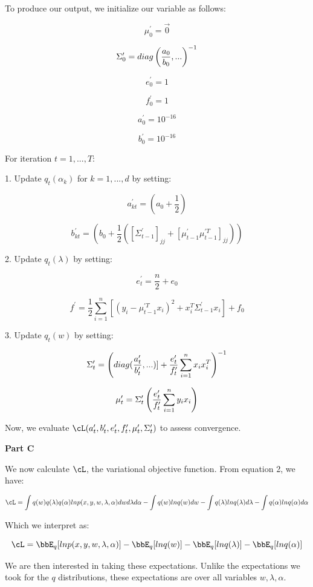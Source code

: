 \documentclass[twoside,11pt]{homework}
\begin{document}
To produce our output, we initialize our variable as follows:

\[
\mu^\prime_0 = \vec{0}
\]

\[
\Sigma^\prime_0 = diag\left(\frac{a_0}{b_0},...\right)^{-1}
\]

\[
e^\prime_0 = 1
\]

\[
f^\prime_0 = 1
\]

\[
a^\prime_0 = 10^{-16}
\]

\[
b^\prime_0 = 10^{-16}
\]

For iteration $t = 1, ..., T$:

1. Update $q_t(\alpha_k)$ for $k = 1, ..., d$ by setting:
	
\[
a^\prime_{kt} = (a_0 + \frac{1}{2})
\]

\[
b^\prime_{kt} = (b_0 + \frac{1}{2}([\Sigma^\prime_{t-1}]_{jj} + [\mu^\prime_{t-1} \mu^{\prime T}_{t-1}]_{jj}))
\]

2. Update $q_t(\lambda)$ by setting:

\[
e^\prime_t = \frac{n}{2} + e_0
\]

\[
f^\prime = \frac{1}{2} \sum_{i=1}^n [(y_i - \mu^{\prime T}_{t-1}x_i)^2 + x_i^T\Sigma^\prime_{t-1} x_i] + f_0
\]

3. Update $q_t(w)$ by setting:

\[
\Sigma^\prime_t = \left(diag(\frac{a^\prime_t}{b^\prime_t},...)] + \frac{e^\prime_t}{f^\prime_t} \sum_{i=1}^n x_i x_i^T\right)^{-1}
\]

\[
\mu^\prime_t = \Sigma^\prime_t \left(\frac{e^\prime_t}{f^\prime_t} \sum_{i=1}^n y_i x_i\right)
\]

Now, we evaluate $\cL(a^\prime_{t}, b^\prime_{t}, e^\prime_t, f^\prime_t, \mu^\prime_t, \Sigma^\prime_t)$ to assess convergence.

\textbf{Part C}

We now calculate $\cL$, the variational objective function. From equation 2, we have:

\[
\cL =
\int q(w)q(\lambda)q(\alpha) ln p(x,y,w, \lambda, \alpha) dw d\lambda d\alpha
- \int q(w)lnq(w)dw
- \int q(\lambda)lnq(\lambda)d\lambda
- \int q(\alpha)lnq(\alpha) d\alpha
\]

Which we interpret as:

\[
\cL =
\bbE_q [ln p(x,y,w, \lambda, \alpha) ]
- \bbE_q[lnq(w)]
- \bbE_q[lnq(\lambda)]
- \bbE_q[lnq(\alpha)]
\]

We are then interested in taking these expectations. Unlike the expectations we took for the $q$ distributions, these expectations are over all variables $w, \lambda, \alpha$.
\end{document}
